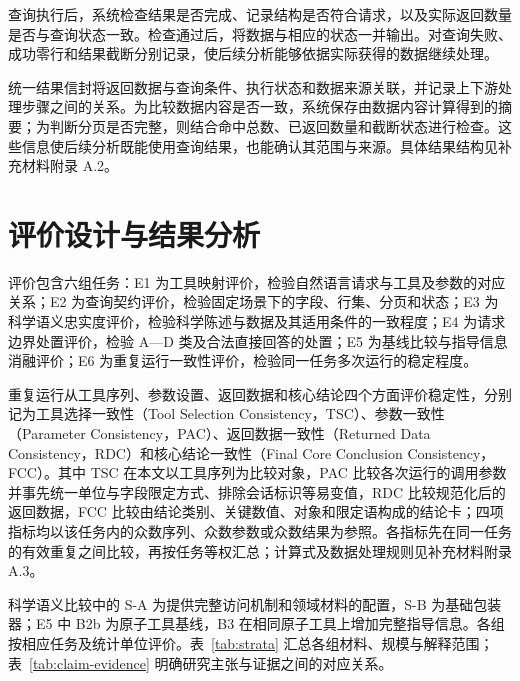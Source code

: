 \documentclass{dcfp}
\begin{document}
\begin{PaperBody}
查询执行后，系统检查结果是否完成、记录结构是否符合请求，以及实际返回数量是否与查询状态一致。检查通过后，将数据与相应的状态一并输出。对查询失败、成功零行和结果截断分别记录，使后续分析能够依据实际获得的数据继续处理。

统一结果信封将返回数据与查询条件、执行状态和数据来源关联，并记录上下游处理步骤之间的关系。为比较数据内容是否一致，系统保存由数据内容计算得到的摘要；为判断分页是否完整，则结合命中总数、已返回数量和截断状态进行检查。这些信息使后续分析既能使用查询结果，也能确认其范围与来源。具体结果结构见补充材料附录 A.2。

\section{评价设计与结果分析}

评价包含六组任务：E1 为工具映射评价，检验自然语言请求与工具及参数的对应关系；E2 为查询契约评价，检验固定场景下的字段、行集、分页和状态；E3 为科学语义忠实度评价，检验科学陈述与数据及其适用条件的一致程度；E4 为请求边界处置评价，检验 A—D 类及合法直接回答的处置；E5 为基线比较与指导信息消融评价；E6 为重复运行一致性评价，检验同一任务多次运行的稳定程度。

重复运行从工具序列、参数设置、返回数据和核心结论四个方面评价稳定性，分别记为工具选择一致性（Tool Selection Consistency，TSC）、参数一致性（Parameter Consistency，PAC）、返回数据一致性（Returned Data Consistency，RDC）和核心结论一致性（Final Core Conclusion Consistency，FCC）。其中 TSC 在本文以工具序列为比较对象，PAC 比较各次运行的调用参数并事先统一单位与字段限定方式、排除会话标识等易变值，RDC 比较规范化后的返回数据，FCC 比较由结论类别、关键数值、对象和限定语构成的结论卡；四项指标均以该任务内的众数序列、众数参数或众数结果为参照。各指标先在同一任务的有效重复之间比较，再按任务等权汇总；计算式及数据处理规则见补充材料附录 A.3。

科学语义比较中的 S-A 为提供完整访问机制和领域材料的配置，S-B 为基础包装器；E5 中 B2b 为原子工具基线，B3 在相同原子工具上增加完整指导信息。各组按相应任务及统计单位评价。表~\ref{tab:strata} 汇总各组材料、规模与解释范围；表~\ref{tab:claim-evidence} 明确研究主张与证据之间的对应关系。


\end{PaperBody}
\end{document}
